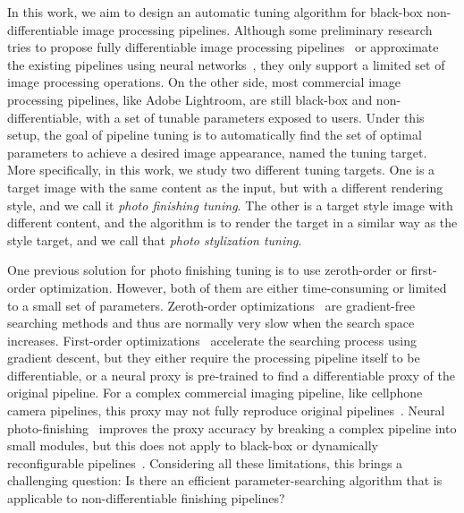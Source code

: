 \documentclass{article}
\newcommand{\tuning}{photo finishing tuning\xspace}
\newcommand{\taskPFT}{photo finishing tuning\xspace}
\newcommand{\taskPST}{photo stylization tuning\xspace}
\begin{document}
In this work, we aim to design an automatic tuning algorithm for black-box non-differentiable image processing pipelines. Although some preliminary research tries to propose fully differentiable image processing pipelines~\cite{hu2018exposure,gharbi2016deep} or approximate the existing pipelines using neural networks~\cite{tseng2022neural}, they only support a limited set of image processing operations. On the other side, most commercial image processing pipelines, like Adobe Lightroom, are still black-box and non-differentiable, with a set of tunable parameters exposed to users. Under this setup, the goal of pipeline tuning is to automatically find the set of optimal parameters to achieve a desired image appearance, named the tuning target. More specifically, in this work, we study two different tuning targets. One is a target image with the same content as the input, but with a different rendering style, and we call it \emph{\taskPFT}. The other is a target style image with different content, and the algorithm is to render the target in a similar way as the style target, and we call that \emph{\taskPST}.

One previous solution for \tuning is to use zeroth-order or first-order optimization. However, both of them are either time-consuming or limited to a small set of parameters. Zeroth-order optimizations~\cite{hansen2006cma, nishimura2018automatic, mosleh2020hardware, chen2017zoo} are gradient-free searching methods and thus are normally very slow when the search space increases.
First-order optimizations~\cite{tseng2019hyperparameter, yu2021reconfigisp, tseng2022neural} accelerate the searching process using gradient descent, but they either require the processing pipeline itself to be differentiable, or a neural proxy is pre-trained to find a differentiable proxy of the original pipeline. For a complex commercial imaging pipeline, like cellphone camera pipelines, this proxy may not fully reproduce original pipelines~\cite{tseng2019hyperparameter}. Neural photo-finishing~\cite{tseng2022neural} improves the proxy accuracy by breaking a complex pipeline into small modules, but this does not apply to black-box or dynamically reconfigurable pipelines~\cite{yu2021reconfigisp}. Considering all these limitations, this brings a challenging question: Is there an efficient parameter-searching algorithm that is applicable to non-differentiable finishing pipelines?
\end{document}
